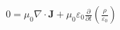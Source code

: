 \documentclass[preview]{standalone}
\begin{document}
\begin{align*}
0 = \mu_{0} \nabla \cdot \mathbf{J} + \mu_{0}\varepsilon_{0}  \frac{\partial}{\partial{t}}\left(\frac{\rho}{\varepsilon_{0}}\right)
\end{align*}
\end{document}
